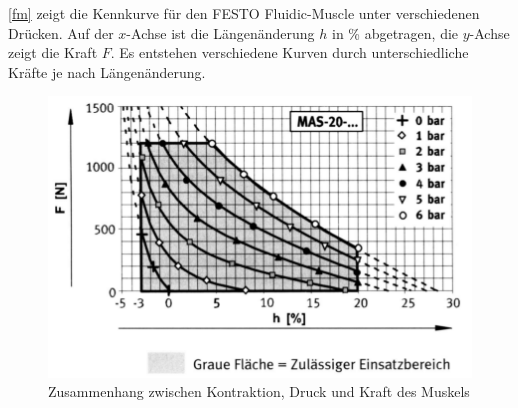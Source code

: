 \autoref{fm} zeigt die Kennkurve für den FESTO Fluidic-Muscle unter verschiedenen Drücken. Auf der $x$-Achse ist die Längenänderung $h$ in \% abgetragen, die $y$-Achse zeigt die Kraft $F$. Es entstehen verschiedene Kurven durch unterschiedliche Kräfte je nach Längenänderung.
\begin{figure}[h!]
	\centering
	\includegraphics[width=0.5\linewidth]{figures/ch03_festo-muskel.png}
	\caption{Zusammenhang zwischen Kontraktion, Druck und Kraft des Muskels}
	\label{fm}
\end{figure}
\newpage
